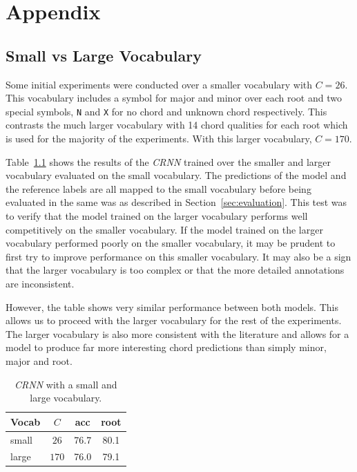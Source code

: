 \appendix

\chapter{Appendix}

\section{Small vs Large Vocabulary}\label{app:small_vs_large_vocabulary}

Some initial experiments were conducted over a smaller vocabulary with $C=26$. This vocabulary includes a symbol for major and minor over each root and two special symbols, \texttt{N} and \texttt{X} for no chord and unknown chord respectively. This contrasts the much larger vocabulary with 14 chord qualities for each root which is used for the majority of the experiments. With this larger vocabulary, $C=170$.

Table~\ref{tab:small_vs_large_vocab} shows the results of the \emph{CRNN} trained over the smaller and larger vocabulary evaluated on the small vocabulary. The predictions of the model and the reference labels are all mapped to the small vocabulary before being evaluated in the same was as described in Section~\ref{sec:evaluation}. This test was to verify that the model trained on the larger vocabulary performs well competitively on the smaller vocabulary. If the model trained on the larger vocabulary performed poorly on the smaller vocabulary, it may be prudent to first try to improve performance on this smaller vocabulary. It may also be a sign that the larger vocabulary is too complex or that the more detailed annotations are inconsistent.

However, the table shows very similar performance between both models. This allows us to proceed with the larger vocabulary for the rest of the experiments. The larger vocabulary is also more consistent with the literature and allows for a model to produce far more interesting chord predictions than simply minor, major and root. 

\begin{table}[H]
    \centering
    \begin{tabular}{lccc}
        \toprule
        Vocab & $C$ & acc & root \\  
        \midrule
        small & $26$ & 76.7 & 80.1 \\
        large & $170$ & 76.0 & 79.1 \\
        \bottomrule
    \end{tabular}
    \caption{\emph{CRNN} with a small and large vocabulary.}\label{tab:small_vs_large_vocab}
\end{table}

